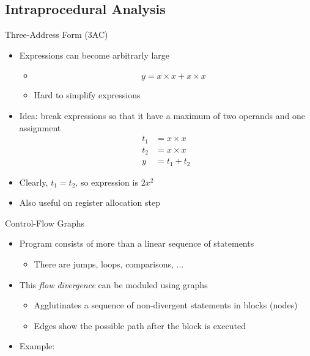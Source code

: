 \subsection{Intraprocedural Analysis}
\begin{frame}{Three-Address Form (3AC)}
\begin{itemize}
    \item Expressions can become arbitrarly large \vspace*{-0.5cm}
    \begin{itemize}
        \item[] $$y = x \times x + x \times x$$ \vspace*{-0.3cm}
        \item Hard to simplify expressions
    \end{itemize}
    \item Idea: break expressions so that it have a maximum of two operands
    and one assignment \vspace*{-0.3cm}
    \begin{align}
          t_1 &= x \times x \nonumber \\
          t_2 &= x \times x \nonumber \\
            y &= t_1 + t_2 \nonumber
    \end{align} \vspace*{-0.6cm}
    \item Clearly, $t_1 = t_2$, so expression is $2x^2$
    \item Also useful on register allocation step
\end{itemize}
\end{frame}


\begin{frame}{Control-Flow Graphs}
\begin{itemize}
    \item Program consists of more than a linear sequence of statements
    \begin{itemize}
        \item There are jumps, loops, comparisons, ...
    \end{itemize}
    \item This \textit{flow divergence} can be moduled using graphs
    \begin{itemize}
        \item Agglutinates a sequence of non-divergent statements in blocks (nodes)
        \item Edges show the possible path after the block is executed
    \end{itemize}
    \item Example:
\end{itemize}
\end{frame}

